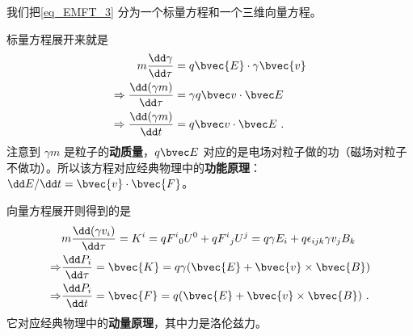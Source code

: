 我们把\autoref{eq_EMFT_3} 分为一个标量方程和一个三维向量方程。

标量方程展开来就是
\begin{equation}
\begin{aligned}
m\frac{\dd \gamma}{\dd\tau}&=q \bvec{E}\cdot \gamma\bvec{v}\\
\Rightarrow\frac{\dd (\gamma m)}{\dd \tau}&=\gamma q \bvec v\cdot \bvec E\\
\Rightarrow \frac{\dd (\gamma m)}{\dd t}&=q\bvec v\cdot \bvec E~.
\end{aligned}
\end{equation}
注意到 $\gamma m$ 是粒子的\textbf{动质量}，$q \bvec E$ 对应的是电场对粒子做的功（磁场对粒子不做功）。所以该方程对应经典物理中的\textbf{功能原理}：$\dd E/\dd t=\bvec{v}\cdot\bvec{F}$。

向量方程展开则得到的是
\begin{equation}
\begin{aligned}
&m\frac{\dd (\gamma v_i)}{\dd \tau} =K^i=q{F^i}_0U^0+q{F^i}_jU^j=q\gamma E_i+q\epsilon_{ijk} \gamma v_j B_k
\\
\Rightarrow &\frac{\dd P_i}{\dd \tau}=\bvec{K}=q\gamma(\bvec{E}+\bvec{v}\times\bvec{B})\\
\Rightarrow &\frac{\dd P_i}{\dd t}=\bvec{F}=q(\bvec{E}+\bvec{v}\times\bvec{B})~.
\end{aligned}
\end{equation}
它对应经典物理中的\textbf{动量原理}，其中力是洛伦兹力。




